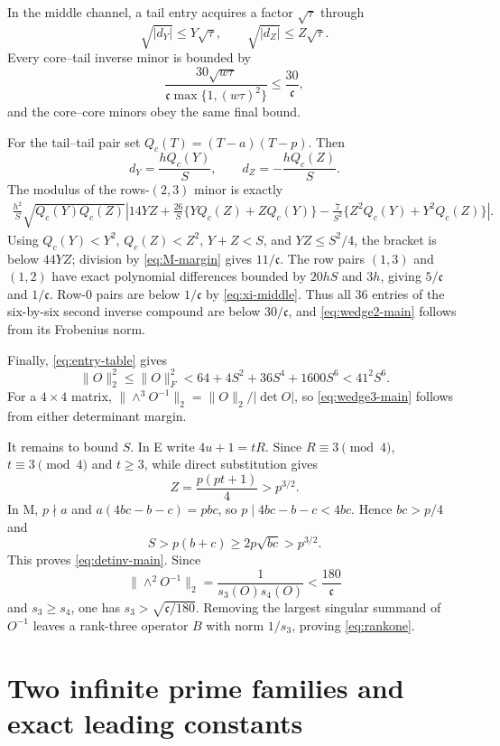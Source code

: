 In the middle channel, a tail entry acquires a factor \(\sqrt\tau\) through
\[
 \sqrt{|d_Y|}\le Y\sqrt\tau,\qquad
 \sqrt{|d_Z|}\le Z\sqrt\tau.
\]
Every core--tail inverse minor is bounded by
\begin{equation}\label{eq:core-tail}
 \frac{30\sqrt{w\tau}}
 {\mathfrak c\max\{1,(w\tau)^2\}}
 \le\frac{30}{\mathfrak c},
\end{equation}
and the core--core minors obey the same final bound.

For the tail--tail pair set \(Q_c(T)=(T-a)(T-p)\). Then
\[
 d_Y=\frac{hQ_c(Y)}S,\qquad d_Z=-\frac{hQ_c(Z)}S.
\]
The modulus of the rows-\((2,3)\) minor is exactly
\begin{align}
 \frac{h^2}{S}\sqrt{Q_c(Y)Q_c(Z)}\left|
 14YZ+\frac{26}{S}\{YQ_c(Z)+ZQ_c(Y)\}
 -\frac7{S^2}\{Z^2Q_c(Y)+Y^2Q_c(Z)\}
 \right|.\label{eq:tail-tail}
\end{align}
Using \(Q_c(Y)<Y^2\), \(Q_c(Z)<Z^2\), \(Y+Z<S\), and
\(YZ\le S^2/4\), the bracket is below \(44YZ\); division by
\eqref{eq:M-margin} gives \(11/\mathfrak c\). The row pairs \((1,3)\) and
\((1,2)\) have exact polynomial differences bounded by \(20hS\) and \(3h\),
giving \(5/\mathfrak c\) and \(1/\mathfrak c\). Row-\(0\) pairs are below
\(1/\mathfrak c\) by \eqref{eq:xi-middle}. Thus all 36 entries of the
six-by-six second inverse compound are below \(30/\mathfrak c\), and
\eqref{eq:wedge2-main} follows from its Frobenius norm.

Finally, \eqref{eq:entry-table} gives
\[
 \|O\|_2^2\le\|O\|_F^2
 <64+4S^2+36S^4+1600S^6<41^2S^6.
\]
For a \(4\times4\) matrix,
\(\|\wedge^3O^{-1}\|_2=\|O\|_2/|\det O|\), so
\eqref{eq:wedge3-main} follows from either determinant margin.

It remains to bound \(S\). In E write \(4u+1=tR\). Since
\(R\equiv3\pmod4\), \(t\equiv3\pmod4\) and \(t\ge3\), while direct
substitution gives
\[
 Z=\frac{p(pt+1)}4>p^{3/2}.
\]
In M, \(p\nmid a\) and \(a(4bc-b-c)=pbc\), so
\(p\mid4bc-b-c<4bc\). Hence \(bc>p/4\) and
\[
 S>p(b+c)\ge2p\sqrt{bc}>p^{3/2}.
\]
This proves \eqref{eq:detinv-main}. Since
\[
 \|\wedge^2O^{-1}\|_2=\frac1{s_3(O)s_4(O)}<\frac{180}{\mathfrak c}
\]
and \(s_3\ge s_4\), one has \(s_3>\sqrt{\mathfrak c/180}\).
Removing the largest singular summand of \(O^{-1}\) leaves a rank-three
operator \(B\) with norm \(1/s_3\), proving \eqref{eq:rankone}.



\section{Two infinite prime families and exact leading constants}

